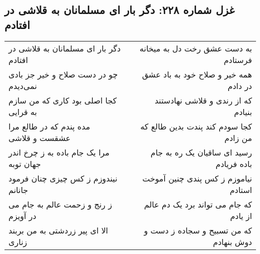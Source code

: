 \begin{center}
\section*{غزل شماره ۲۲۸: دگر بار ای مسلمانان به قلاشی در افتادم}
\label{sec:228}
\begin{longtable}{l p{0.5cm} r}
دگر بار ای مسلمانان به قلاشی در افتادم
&&
به دست عشق رخت دل به میخانه فرستادم
\\
چو در دست صلاح و خیر جز بادی نمی‌دیدم
&&
همه خیر و صلاح خود به باد عشق در دادم
\\
کجا اصلی بود کاری که من سازم به قرایی
&&
که از رندی و قلاشی نهادستند بنیادم
\\
مده پندم که در طالع مرا عشقست و قلاشی
&&
کجا سودم کند پندت بدین طالع که من زادم
\\
مرا یک جام باده به ز چرخ اندر جهان توبه
&&
رسید ای ساقیان یک ره به جام باده فریادم
\\
نیندوزم ز کس چیزی چنان فرمود جانانم
&&
نیاموزم ز کس پندی چنین آموخت استادم
\\
ز رنج و زحمت عالم به جام می در آویزم
&&
که جام می تواند برد یک دم عالم از یادم
\\
الا ای پیر زردشتی به من بربند زناری
&&
که من تسبیح و سجاده ز دست و دوش بنهادم
\\
\end{longtable}
\end{center}
